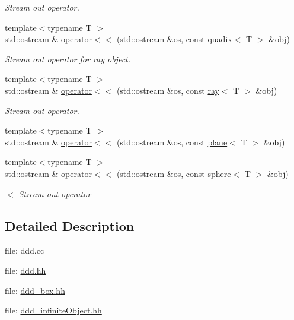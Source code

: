 \begin{DoxyCompactItemize}
\begin{DoxyCompactList}\small\item\em Stream out operator. \end{DoxyCompactList}\item 
{\footnotesize template$<$typename T $>$ }\\std\+::ostream \& \hyperlink{namespaceddd_a58ae88cefdf3b919e400db6de59f4cfc}{operator$<$$<$} (std\+::ostream \&os, const \hyperlink{classddd_1_1quadix}{quadix}$<$ T $>$ \&obj)
\begin{DoxyCompactList}\small\item\em Stream out operator for ray object. \end{DoxyCompactList}\item 
{\footnotesize template$<$typename T $>$ }\\std\+::ostream \& \hyperlink{namespaceddd_ae2604d6c72853dfb2595f6882cbc7a51}{operator$<$$<$} (std\+::ostream \&os, const \hyperlink{classddd_1_1ray}{ray}$<$ T $>$ \&obj)
\begin{DoxyCompactList}\small\item\em Stream out operator. \end{DoxyCompactList}\item 
{\footnotesize template$<$typename T $>$ }\\std\+::ostream \& \hyperlink{namespaceddd_af1faa02295670c7cfd7f0278e3973f84}{operator$<$$<$} (std\+::ostream \&os, const \hyperlink{classddd_1_1plane}{plane}$<$ T $>$ \&obj)
\item 
{\footnotesize template$<$typename T $>$ }\\std\+::ostream \& \hyperlink{namespaceddd_a64dbb41c0ee377eb528907f3448514f6}{operator$<$$<$} (std\+::ostream \&os, const \hyperlink{classddd_1_1sphere}{sphere}$<$ T $>$ \&obj)
\begin{DoxyCompactList}\small\item\em $<$ Stream out operator \end{DoxyCompactList}\end{DoxyCompactItemize}


\subsection{Detailed Description}
file\+: ddd.\+cc

file\+: \hyperlink{ddd_8hh_source}{ddd.\+hh}

file\+: \hyperlink{ddd__box_8hh_source}{ddd\+\_\+box.\+hh}

file\+: \hyperlink{ddd__infinite_object_8hh_source}{ddd\+\_\+infinite\+Object.\+hh}

